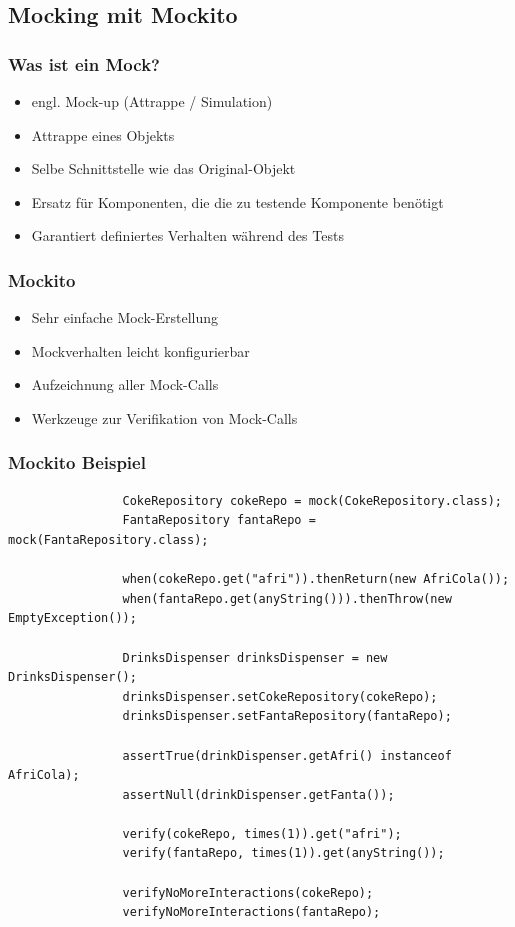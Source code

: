 \documentclass{beamer}
\begin{document}
		\subsection{Mocking mit Mockito}

			\begin{frame}
				\frametitle{Was ist ein Mock?}

				\begin{itemize}
					\item{engl. Mock-up (Attrappe / Simulation)}
					\item{Attrappe eines Objekts}
					\item{Selbe Schnittstelle wie das Original-Objekt}
					\item{Ersatz für Komponenten, die die zu testende Komponente benötigt}
					\item{Garantiert definiertes Verhalten während des Tests}
				\end{itemize}
			\end{frame}

			\begin{frame}
				\frametitle{Mockito}

				\begin{itemize}
					\item{Sehr einfache Mock-Erstellung}
					\item{Mockverhalten leicht konfigurierbar}
					\item{Aufzeichnung aller Mock-Calls}
					\item{Werkzeuge zur Verifikation von Mock-Calls}
				\end{itemize}
			\end{frame}

			\begin{frame}[fragile]
				\frametitle{Mockito Beispiel}
				\begin{lstlisting}
				CokeRepository cokeRepo = mock(CokeRepository.class);
				FantaRepository fantaRepo = mock(FantaRepository.class);

				when(cokeRepo.get("afri")).thenReturn(new AfriCola());
				when(fantaRepo.get(anyString())).thenThrow(new EmptyException());

				DrinksDispenser drinksDispenser = new DrinksDispenser();
				drinksDispenser.setCokeRepository(cokeRepo);
				drinksDispenser.setFantaRepository(fantaRepo);

				assertTrue(drinkDispenser.getAfri() instanceof AfriCola);
				assertNull(drinkDispenser.getFanta());

				verify(cokeRepo, times(1)).get("afri");
				verify(fantaRepo, times(1)).get(anyString());

				verifyNoMoreInteractions(cokeRepo);
				verifyNoMoreInteractions(fantaRepo);
				\end{lstlisting}
				
			\end{frame}
\end{document}
